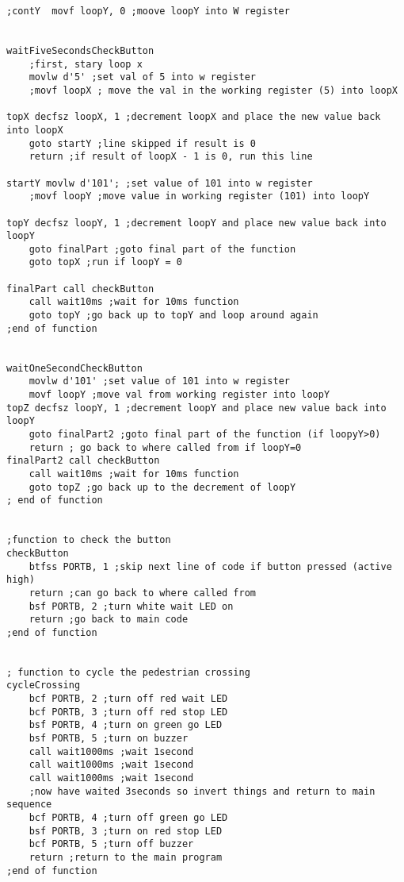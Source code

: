 \begin{lstlisting}[language={[x86masm]Assembler}, style=assembly, caption=Full code listing]
;contY	movf loopY, 0 ;moove loopY into W register
	

waitFiveSecondsCheckButton
	;first, stary loop x
	movlw d'5' ;set val of 5 into w register
	;movf loopX ; move the val in the working register (5) into loopX

topX decfsz loopX, 1 ;decrement loopX and place the new value back into loopX
	goto startY ;line skipped if result is 0
	return ;if result of loopX - 1 is 0, run this line

startY movlw d'101'; ;set value of 101 into w register
	;movf loopY ;move value in working register (101) into loopY

topY decfsz loopY, 1 ;decrement loopY and place new value back into loopY
	goto finalPart ;goto final part of the function
	goto topX ;run if loopY = 0

finalPart call checkButton
	call wait10ms ;wait for 10ms function
	goto topY ;go back up to topY and loop around again
;end of function


waitOneSecondCheckButton
	movlw d'101' ;set value of 101 into w register
	movf loopY ;move val from working register into loopY
topZ decfsz loopY, 1 ;decrement loopY and place new value back into loopY
	goto finalPart2 ;goto final part of the function (if loopyY>0)
	return ; go back to where called from if loopY=0
finalPart2 call checkButton
	call wait10ms ;wait for 10ms function
	goto topZ ;go back up to the decrement of loopY
; end of function


;function to check the button
checkButton
	btfss PORTB, 1 ;skip next line of code if button pressed (active high)
	return ;can go back to where called from
	bsf PORTB, 2 ;turn white wait LED on
	return ;go back to main code
;end of function


; function to cycle the pedestrian crossing
cycleCrossing
	bcf PORTB, 2 ;turn off red wait LED
	bcf PORTB, 3 ;turn off red stop LED
	bsf PORTB, 4 ;turn on green go LED
	bsf PORTB, 5 ;turn on buzzer
	call wait1000ms ;wait 1second
	call wait1000ms ;wait 1second
	call wait1000ms ;wait 1second
	;now have waited 3seconds so invert things and return to main sequence
	bcf PORTB, 4 ;turn off green go LED
	bsf PORTB, 3 ;turn on red stop LED
	bcf PORTB, 5 ;turn off buzzer
	return ;return to the main program
;end of function


\end{lstlisting}
